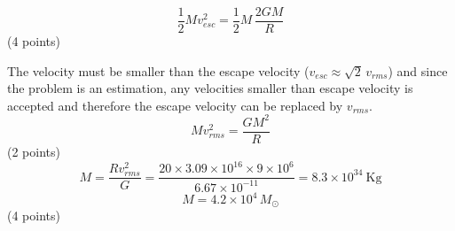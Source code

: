 \[
  \frac{1}{2}Mv_{esc}^2 = \frac{1}{2}M\,\frac{2GM}{R}
\]
\hfill(4 points)

The velocity must be smaller than the escape velocity
($v_{esc} \approx \sqrt{2}\,v_{rms}$) and since the problem is an estimation,
any velocities smaller than escape velocity is accepted and therefore the
escape velocity can be replaced by $v_{rms}$.
\[
  Mv_{rms}^2 = \frac{GM^2}{R}
\]
\hfill(2 points)
\[
  M = \frac{Rv_{rms}^2}{G}
    = \frac{20 \times 3.09\times10^{16} \times 9\times10^{6}}{6.67\times10^{-11}}
    = 8.3\times10^{34}\ \mathrm{Kg}
\]
\[
  M = 4.2\times10^{4}\,M_\odot
\]
\hfill(4 points)
